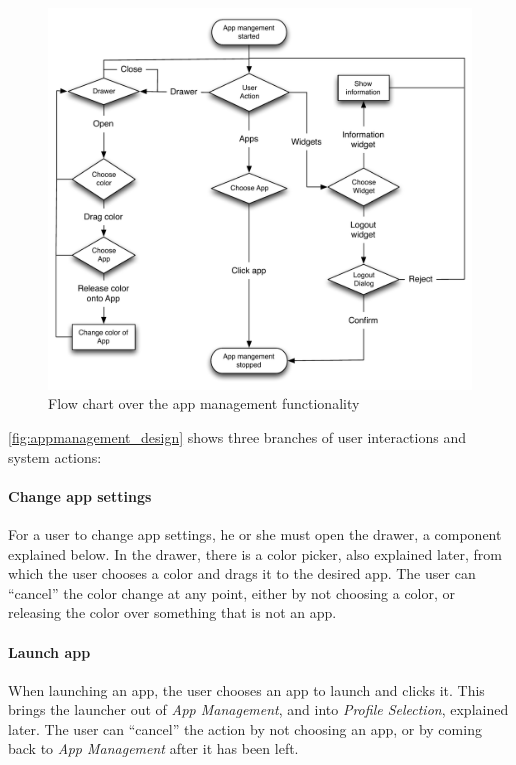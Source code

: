 \begin{figure}[!h]
	\centering
	\includegraphics[width=1\textwidth]{gfx/appmanagement.pdf}
	\caption{Flow chart over the app management functionality}
	\label{fig:appmanagement_design}
\end{figure}

\autoref{fig:appmanagement_design} shows three branches of user interactions and system actions:


\paragraph{Change app settings} For a user to change app settings, he or she must open the drawer, a component explained below. 
In the drawer, there is a color picker, also explained later, from which the user chooses a color and drags it to the desired app. 
The user can ``cancel'' the color change at any point, either by not choosing a color, or releasing the color over something that is not an app. 

\paragraph{Launch app} When launching an app, the user chooses an app to launch and clicks it. 
This brings the launcher out of \emph{App Management}, and into \emph{Profile Selection}, explained later. 
The user can ``cancel'' the action by not choosing an app, or by coming back to \emph{App Management} after it has been left.

